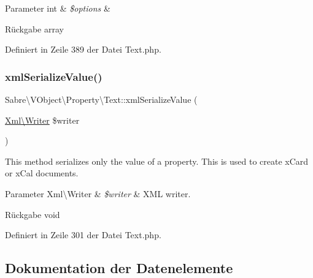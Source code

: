\begin{DoxyParams}[1]{Parameter}
int & {\em \$options} & \\
\hline
\end{DoxyParams}
\begin{DoxyReturn}{Rückgabe}
array 
\end{DoxyReturn}


Definiert in Zeile 389 der Datei Text.\+php.

\mbox{\label{class_sabre_1_1_v_object_1_1_property_1_1_text_aa92c38ce4f1e976efb8de620ef3734db}} 
\subsubsection{\texorpdfstring{xml\+Serialize\+Value()}{xmlSerializeValue()}}
{\footnotesize\ttfamily Sabre\textbackslash{}\+V\+Object\textbackslash{}\+Property\textbackslash{}\+Text\+::xml\+Serialize\+Value (\begin{DoxyParamCaption}\item[{\mbox{\hyperlink{class_sabre_1_1_xml_1_1_writer}{Xml\textbackslash{}\+Writer}}}]{\$writer }\end{DoxyParamCaption})\hspace{0.3cm}{\ttfamily [protected]}}

This method serializes only the value of a property. This is used to create x\+Card or x\+Cal documents.


\begin{DoxyParams}[1]{Parameter}
Xml\textbackslash{}\+Writer & {\em \$writer} & X\+ML writer.\\
\hline
\end{DoxyParams}
\begin{DoxyReturn}{Rückgabe}
void 
\end{DoxyReturn}


Definiert in Zeile 301 der Datei Text.\+php.



\subsection{Dokumentation der Datenelemente}
\mbox{\label{class_sabre_1_1_v_object_1_1_property_1_1_text_a710f845fae0016b4aecc00e4d92292be}} 
